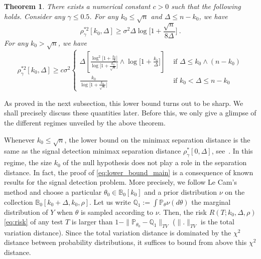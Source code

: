 \documentclass[twoside,11pt]{article}
\newtheorem{thm}{Theorem}
\def\beq{\begin{equation}}
\def\eeq{\end{equation}}
\def\bbB{\mathbb{B}}
\def\bbQ{\mathbb{Q}}
\newcommand{\<}{\langle}
\renewcommand{\>}{\rangle}
\begin{document}
\begin{thm}\label{prp:lower}
There exists a numerical constant $c>0$ such that the following holds.
Consider any $\gamma\leq 0.5$.  For any  $k_0 \leq \sqrt{n}$ and $\Delta\leq n-k_0$, we have
 \beq\label{eq:lower_bound_main}
 \rho_{\gamma}^{*2}[k_0,\Delta] \geq  \sigma^2 \Delta \log\Big[1+ \frac{ \sqrt{n}}{8\Delta} \Big]\ .
 \eeq
 For any $k_0>\sqrt{n}$, we have
 \beq\label{eq:lower_bound_main2}
 \rho_{\gamma}^{*2}[k_0,\Delta] \geq c\sigma^2 \left\{ \begin{array}{cc}                 
 \Delta \left[\frac{\log^2\big[1+  \frac{k_0}{\Delta}\big]}{\log\big[1+ \frac{k_0}{\sqrt{n}}\big]}\wedge \log\big[1+ \frac{k_0}{\Delta}\big] \right] & \text{ if $\Delta\leq k_0\wedge  (n-k_0)$}\\
 \frac{k_0}{\log\big[1+ \frac{k_0}{\sqrt{n}}\big]} & \text{ if } k_0< \Delta \leq n-k_0
 \end{array} \right.
 \eeq

\end{thm}
As proved in the next subsection, this lower bound turns out to be sharp. We shall precisely discuss these quantities later. Before this, we only give a glimpse of the different regimes unveiled by the above theorem. 


Whenever  $k_0 \leq \sqrt{n}$,  
the lower bound on the minimax separation distance is the same as the signal detection minimax separation distance $\rho^*_{\gamma}[0,\Delta]$, see~\cite{baraud02,collier2015minimax}. In this regime, the size $k_0$ of the null hypothesis does not play a role in the separation distance. In fact, the proof of \eqref{eq:lower_bound_main} is a consequence of known results for the signal detection problem. More precisely, we follow Le Cam's method and choose  a particular $\theta_0\in \bbB_0[k_0]$ and  a  prior distribution $\nu$ on the collection $\bbB_0[k_0+\Delta,k_0,\rho]$. Let us write $\bbQ_1:= \int \mathbb{P}_{\theta}\nu(d\theta)$ the marginal distribution of $Y$ when $\theta$ is sampled according to $\nu$. Then, the risk $R(T;k_0,\Delta,\rho)$ \eqref{eq:risk} of any test $T$ is larger than $1-\|\mathbb{P}_{\theta_0}-\bbQ_1\|_{TV}$ ($\|.\|_{TV}$ is the total variation distance). Since the total variation distance is dominated by the $\chi^2$ distance between probability distributions, it suffices to bound from above this $\chi^2$ distance. 
\end{document}
